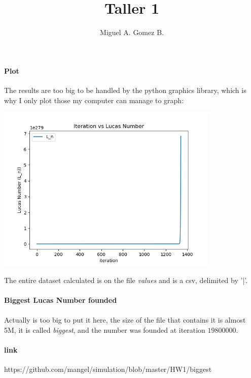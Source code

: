\documentclass{article}
\title{Taller 1}
\author{Miguel A. Gomez B.}
\begin{document}
	\maketitle

\paragraph{Plot} The results are too big to be handled by the python graphics library, which is why I only plot those my computer can manage to graph:
\begin{center}
	\includegraphics[width=0.8\textwidth]{Plot}
\end{center}

The entire dataset calculated is on the file \textit{values} and is a csv, delimited by '|'.

\paragraph{Biggest Lucas Number founded}
\paragraph{} Actually is too big to put it here, the size of the file that contains it is almost 5M, it is called \textit{biggest}, and the number was founded at iteration $19800000$.\\

\paragraph{link} https://github.com/mangel/simulation/blob/master/HW1/biggest
\end{document}
